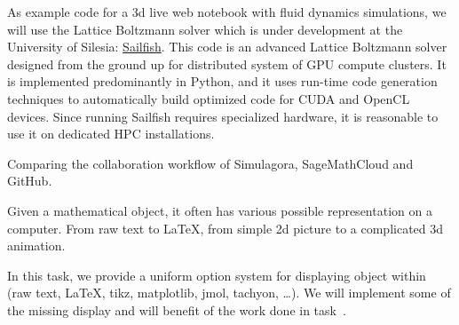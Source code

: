 \begin{workpackage}
\begin{tasklist}
\begin{task}[title=Visualization system for 3d data in web-notebook
,id=vis3d,lead=SR, partners={US,PS,USO}]
\begin{task}[title=Visualization of 3d fluid dynamics data in web-notebook
,id=cfd-vis,lead=SR, partners={US,PS,USO}]
As example code for a 3d live web notebook with fluid dynamics
simulations, we will use the Lattice Boltzmann solver which is under
development at the University of Silesia:
\href{http://sailfish.us.edu.pl/}{Sailfish}.  This code is an advanced
Lattice Boltzmann solver designed from the ground up for distributed
system of GPU compute clusters. It is implemented predominantly in
Python, and it uses run-time code generation techniques to
automatically build optimized code for CUDA and OpenCL devices. Since
running Sailfish requires specialized hardware, it is reasonable to
use it on dedicated HPC installations.


\end{task}


\begin{task}[id=mws,title=Math Search Engine,lead=JU,PM=10]
\end{task}

\begin{task}[id=simulagora,title=Simulagora collaboration,lead=LL,PM=2]
  Comparing the collaboration workflow of Simulagora, SageMathCloud and GitHub.
\end{task}

\begin{task}[lead=UB,title=Common option system for various displays in Sage,id=Sage-display,PM=12,partners={UB}]
  Given a mathematical object, it often has various possible representation on a
  computer. From raw text to \LaTeX, from simple 2d picture to
  a complicated 3d animation.

  In this task, we provide a uniform option system for displaying object within \Sage (raw text, \LaTeX,
  tikz, matplotlib, jmol, tachyon, \ldots). We will implement some of the missing display and will benefit
  of the work done in task~.
\end{task}

\begin{task}[lead=USO,title=Case study: micromagnetic VRE built from
  \TheProject,id=oommf-py-ipython-attributes,PM=6,partners={SR,USH}]


\end{task}
\end{task}
\end{tasklist}
\end{workpackage}
